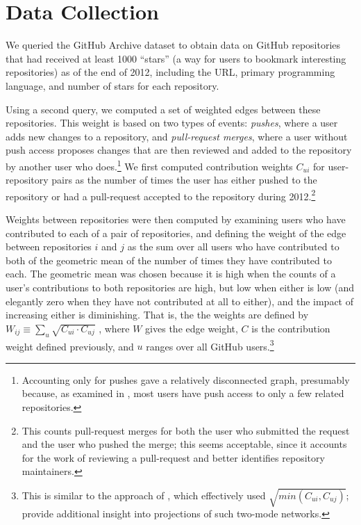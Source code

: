 \documentclass[11pt]{article}
\begin{document}
\section{Data Collection}
We queried the GitHub Archive dataset\cite{githubarchive} to obtain data on
GitHub repositories that had received at least 1000 ``stars'' (a way for users
to bookmark interesting repositories) as of the end of 2012, including the URL,
primary programming language, and number of stars for each repository.

Using a second query, we computed a set of weighted edges between these
repositories. This weight is based on two types of events: \emph{pushes}, where
a user adds new changes to a repository, and \emph{pull-request merges}, where a
user without push access proposes changes that are then reviewed and added to
the repository by another user who does.\footnote{Accounting only for pushes
gave a relatively disconnected graph, presumably because, as examined in
\cite{khadke}, most users have push access to only a few related repositories.}
We first computed contribution weights $C_{ui}$ for user-repository pairs as the
number of times the user has either pushed to the repository or had a
pull-request accepted to the repository during 2012.\footnote{This counts
pull-request merges for both the user who submitted the request and the user who
pushed the merge; this seems acceptable, since it accounts for the work of
reviewing a pull-request and better identifies repository maintainers.}

Weights between repositories were then computed by examining users who have
contributed to each of a pair of repositories, and defining the weight of the
edge between repositories $i$ and $j$ as the sum over all users who have
contributed to both of the geometric mean of the number of times they have
contributed to each. The geometric mean was chosen because it is high when the
counts of a user's contributions to both repositories are high, but low when
either is low (and elegantly zero when they have not contributed at all to
either), and the impact of increasing either is diminishing. That is, the the
weights are defined by $W_{ij} \equiv \sum_u \sqrt{C_{ui} \cdot C_{uj}}$ , where
$W$ gives the edge weight, $C$ is the contribution weight defined previously,
and $u$ ranges over all GitHub users.\footnote{This is similar to the approach
of \cite{marrama}, which effectively used $\sqrt{min(C_{ui}, C_{uj})}$;
\cite{opsahlproj,opsahl11} provide additional insight into projections of
such two-mode networks.}
\end{document}
